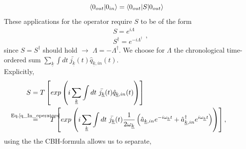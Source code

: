 \documentclass[12pt, titlepage]{article}
\begin{document}
\begin{subappendices}
\begin{equation}
\braket{0_{out}|0_{in}}=\braket{0_{out}|S|0_{out}}
\end{equation}
These applications for the operator require $ S $ to be of the form
\begin{equation}
\begin{split}
&S=e^{i\Lambda}\\
&S^{\dagger}=e^{-i\Lambda^{\dagger}}
\end{split}
,
\end{equation}
since $ S=S^{\dagger} $ should hold $ \rightarrow $ $ \Lambda =-\Lambda^{\dagger} $. We choose for $ \Lambda $ the chronological time-ordered sum $ \sum_{\underline{k}}\int dt \ \bar{j_{\underline{k}}}(t) \hat{q}_{\underline{k},in}(t) $.\\
Explicitly,
\begin{subequations}
\begin{align}
	S &=
	T\left[
    exp
    \left(
    i
    \sum_{\underline{k}}\int dt \ \bar{j_{\underline{k}}}(t) \hat{q}_{\underline{k},in}(t) 
    \right)
    \right]  
   \\
   &\stackrel{\mathclap{\text{Eq.\text{\eqref{q_In_operators}}}}}{=} \hspace*{1.5em} 
   T\left[
   exp
   \left(
       i
    \sum_{\underline{k}}\int dt \ \bar{j_{\underline{k}}}(t)
     \dfrac{1}{2\omega_{\underline{k}}}\left(
	\hat{a}_{\underline{k},in} 
	e^{-i\omega_{\underline{k}}t}
	+
	\hat{a}^{\dagger}_{\underline{k},in}  
	e^{i\omega_{\underline{k}}t}
  \right)
   \right)
   \right]   
,
\end{align}
\end{subequations}
using the the CBH-formula allows us to separate,
\begin{equation}
\begin{split}

\end{split}
\end{equation}
\end{subappendices}
\end{document}
